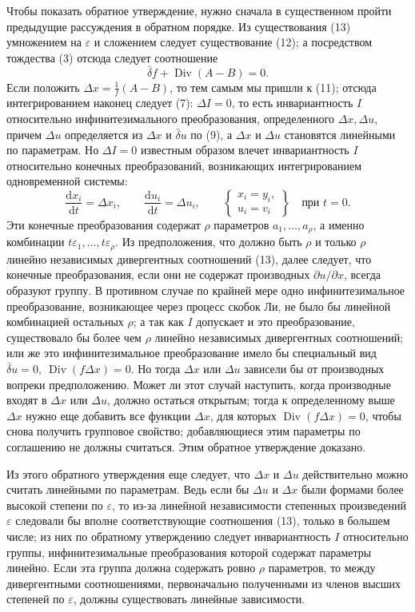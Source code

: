 \documentclass[11pt]{article}
\providecommand{\eps}{\varepsilon}
\providecommand{\D}{\Delta}
\providecommand{\p}{\partial}
\providecommand{\dd}{\mathrm d}
\DeclareMathOperator{\Div}{Div}
\providecommand{\bd}{\bar{\delta}}
\begin{document}
Чтобы показать обратное утверждение, нужно сначала в существенном пройти предыдущие рассуждения в обратном порядке. Из существования (13) умножением на \(\eps\) и сложением следует существование (12); а посредством тождества (3) отсюда следует соотношение
\[
\bd f+\Div(A-B)=0.
\]
Если положить \(\D x=\frac{1}{f}(A-B)\), то тем самым мы пришли к (11); отсюда интегрированием наконец следует (7): \(\D I=0\), то есть инвариантность \(I\) относительно инфинитезимального преобразования, определенного \(\D x,\D u\), причем \(\D u\) определяется из \(\D x\) и \(\bd u\) по (9), а \(\D x\) и \(\D u\) становятся линейными по параметрам. Но \(\D I=0\) известным образом влечет инвариантность \(I\) относительно конечных преобразований, возникающих интегрированием одновременной системы:
\begin{equation}
\frac{\dd x_i}{\dd t}=\D x_i,\qquad
\frac{\dd u_i}{\dd t}=\D u_i,\qquad
\left\{\begin{array}{l}
x_i=y_i,\\
u_i=v_i
\end{array}\right\}
\quad\text{при }t=0.
\tag{17}
\end{equation}
Эти конечные преобразования содержат \(\rho\) параметров \(a_1,\ldots,a_\rho\), а именно комбинации \(t\eps_1,\ldots,t\eps_\rho\). Из предположения, что должно быть \(\rho\) и только \(\rho\) линейно независимых дивергентных соотношений (13), далее следует, что конечные преобразования, если они не содержат производных \(\p u/\p x\), всегда образуют группу. В противном случае по крайней мере одно инфинитезимальное преобразование, возникающее через процесс скобок Ли, не было бы линейной комбинацией остальных \(\rho\); а так как \(I\) допускает и это преобразование, существовало бы более чем \(\rho\) линейно независимых дивергентных соотношений; или же это инфинитезимальное преобразование имело бы специальный вид \(\bd u=0,\ \Div(f\D x)=0\). Но тогда \(\D x\) или \(\D u\) зависели бы от производных вопреки предположению. Может ли этот случай наступить, когда производные входят в \(\D x\) или \(\D u\), должно остаться открытым; тогда к определенному выше \(\D x\) нужно еще добавить все функции \(\D x\), для которых \(\Div(f\D x)=0\), чтобы снова получить групповое свойство; добавляющиеся этим параметры по соглашению не должны считаться. Этим обратное утверждение доказано.

Из этого обратного утверждения еще следует, что \(\D x\) и \(\D u\) действительно можно считать линейными по параметрам. Ведь если бы \(\D u\) и \(\D x\) были формами более высокой степени по \(\eps\), то из-за линейной независимости степенных произведений \(\eps\) следовали бы вполне соответствующие соотношения (13), только в большем числе; из них по обратному утверждению следует инвариантность \(I\) относительно группы, инфинитезимальные преобразования которой содержат параметры линейно. Если эта группа должна содержать ровно \(\rho\) параметров, то между дивергентными соотношениями, первоначально полученными из членов высших степеней по \(\eps\), должны существовать линейные зависимости.
\end{document}
